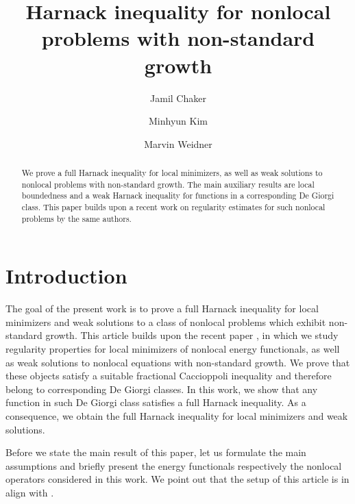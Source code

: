 \documentclass[11pt]{amsart}
\title[Harnack inequality for nonlocal problems with non-standard growth]{Harnack inequality for nonlocal problems with non-standard growth}
\author{Jamil Chaker}
\author{Minhyun Kim}
\author{Marvin Weidner}
\theoremstyle{plain}
\theoremstyle{definition}
\numberwithin{equation}{section}
\begin{document}
\begin{abstract}
We prove a full Harnack inequality for local minimizers, as well as weak solutions to nonlocal problems with non-standard growth.
The main auxiliary results are local boundedness and a weak Harnack inequality for functions in a corresponding De Giorgi class.
This paper builds upon a recent work on regularity estimates for such nonlocal problems by the same authors.
\end{abstract}

\maketitle

\section{Introduction} \label{sec:introduction}
The goal of the present work is to prove a full Harnack inequality for local minimizers and weak solutions to a class of nonlocal problems which exhibit non-standard growth. 
This article builds upon the recent paper \cite{ChKiWe21}, in which we study regularity properties for local minimizers of nonlocal energy functionals, as well as weak solutions to nonlocal equations with non-standard growth. We prove that these objects satisfy a suitable fractional Caccioppoli inequality and therefore belong to corresponding De Giorgi classes. In this work, we show that any function in such De Giorgi class satisfies a full Harnack inequality.
As a consequence, we obtain the full Harnack inequality for local minimizers and weak solutions. 

Before we state the main result of this paper, let us formulate the main assumptions and briefly present the energy functionals respectively the nonlocal operators considered in this work. We point out that the setup of this article is in align with \cite{ChKiWe21}.
\end{document}
